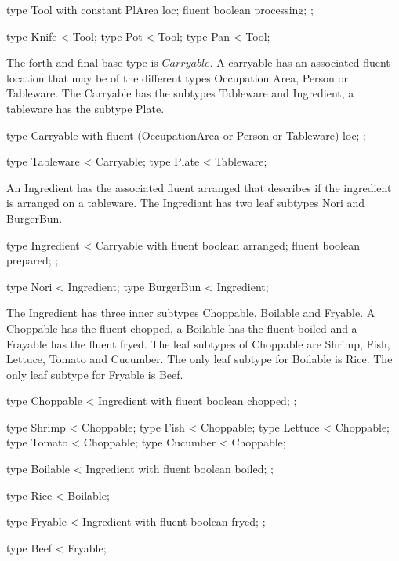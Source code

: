 \begin{anmlcode}
type Tool with {
  constant PlArea loc;
  fluent boolean processing;
};

type Knife < Tool;
type Pot < Tool;
type Pan < Tool;
\end{anmlcode}

The forth and final base type is $Carryable$.
A carryable has an associated fluent location that may be of the different types Occupation Area, Person or Tableware.
The Carryable has the subtypes Tableware and Ingredient, a tableware has the subtype Plate.

\begin{anmlcode}
type Carryable with {
  fluent (OccupationArea or Person or Tableware) loc;
};

type Tableware < Carryable;
type Plate < Tableware;
\end{anmlcode}

An Ingredient has the associated fluent arranged that describes if the ingredient is arranged on a tableware.
The Ingrediant has two leaf subtypes Nori and BurgerBun.

\begin{anmlcode}
type Ingredient < Carryable with {
  fluent boolean arranged;
  fluent boolean prepared;
};

type Nori < Ingredient;
type BurgerBun < Ingredient;
\end{anmlcode}

The Ingredient has three inner  subtypes Choppable, Boilable and Fryable.
A Choppable has the fluent chopped, a Boilable has the fluent boiled and a Frayable has the fluent fryed.
The leaf subtypes of Choppable are Shrimp, Fish, Lettuce, Tomato and Cucumber.
The only leaf subtype for Boilable is Rice.
The only leaf subtype for Fryable is Beef.

\begin{anmlcode}
type Choppable < Ingredient with {
  fluent boolean chopped;
};

type Shrimp < Choppable;
type Fish < Choppable;
type Lettuce < Choppable;
type Tomato < Choppable;
type Cucumber < Choppable;

type Boilable < Ingredient with {
  fluent boolean boiled;
};

type Rice < Boilable;


type Fryable < Ingredient with {
  fluent boolean fryed;
};

type Beef < Fryable;
\end{anmlcode}


